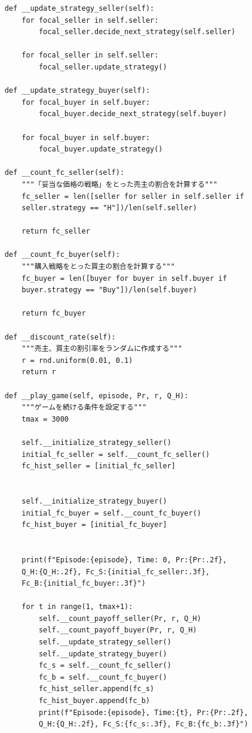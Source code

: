 \documentclass[a4paper,fontsize=11pt,report,notitlepage,line_length=38zw,number_of_lines=40,dvipdfmx]{jlreq}
\begin{document}
\begin{lstlisting}
    def __update_strategy_seller(self):
        for focal_seller in self.seller:
            focal_seller.decide_next_strategy(self.seller)
        
        for focal_seller in self.seller:
            focal_seller.update_strategy()

    def __update_strategy_buyer(self):
        for focal_buyer in self.buyer:
            focal_buyer.decide_next_strategy(self.buyer)
        
        for focal_buyer in self.buyer:
            focal_buyer.update_strategy()

    def __count_fc_seller(self):
        """「妥当な価格の戦略」をとった売主の割合を計算する"""
        fc_seller = len([seller for seller in self.seller if 
        seller.strategy == "H"])/len(self.seller)
    
        return fc_seller

    def __count_fc_buyer(self):
        """購入戦略をとった買主の割合を計算する"""        
        fc_buyer = len([buyer for buyer in self.buyer if 
        buyer.strategy == "Buy"])/len(self.buyer)
    
        return fc_buyer

    def __discount_rate(self):
        """売主、買主の割引率をランダムに作成する"""
        r = rnd.uniform(0.01, 0.1)
        return r

    def __play_game(self, episode, Pr, r, Q_H):
        """ゲームを続ける条件を設定する"""
        tmax = 3000

        self.__initialize_strategy_seller()
        initial_fc_seller = self.__count_fc_seller()
        fc_hist_seller = [initial_fc_seller]
        

        self.__initialize_strategy_buyer()
        initial_fc_buyer = self.__count_fc_buyer()
        fc_hist_buyer = [initial_fc_buyer]


        print(f"Episode:{episode}, Time: 0, Pr:{Pr:.2f}, 
        Q_H:{Q_H:.2f}, Fc_S:{initial_fc_seller:.3f}, 
        Fc_B:{initial_fc_buyer:.3f}")

        for t in range(1, tmax+1):
            self.__count_payoff_seller(Pr, r, Q_H)
            self.__count_payoff_buyer(Pr, r, Q_H)
            self.__update_strategy_seller()
            self.__update_strategy_buyer()
            fc_s = self.__count_fc_seller()
            fc_b = self.__count_fc_buyer()
            fc_hist_seller.append(fc_s)
            fc_hist_buyer.append(fc_b)
            print(f"Episode:{episode}, Time:{t}, Pr:{Pr:.2f}, 
            Q_H:{Q_H:.2f}, Fc_S:{fc_s:.3f}, Fc_B:{fc_b:.3f}")



\end{lstlisting}
\end{document}
